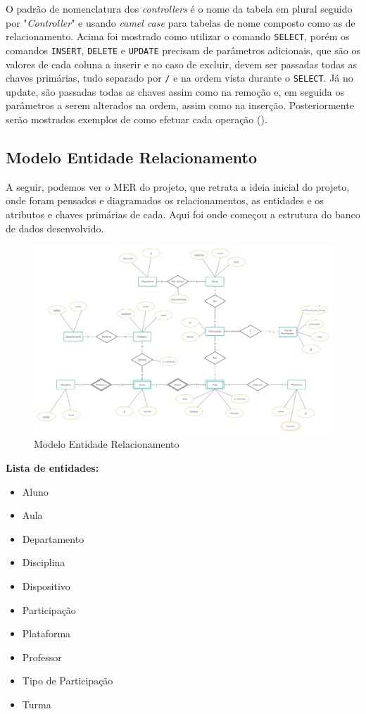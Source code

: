 \documentclass[12pt]{article}
\begin{document}
O padrão de nomenclatura dos \textit{controllers} é o nome da tabela em plural seguido por "\textit{Controller}" e usando \textit{camel case} para tabelas de nome composto como as de relacionamento. Acima foi mostrado como utilizar o comando \texttt{SELECT}, porém os comandos \texttt{INSERT}, \texttt{DELETE} e \texttt{UPDATE} precisam de parâmetros adicionais, que são os valores de cada coluna a inserir e no caso de excluir, devem ser passadas todas as chaves primárias, tudo separado por \texttt{/} e na ordem vista durante o \texttt{SELECT}. Já no update, são passadas todas as chaves assim como na remoção e, em seguida os parâmetros a serem alterados na ordem, assim como na inserção. Posteriormente serão mostrados exemplos de como efetuar cada operação (\pageref{operacoes}).

\subsection*{Modelo Entidade Relacionamento}
A seguir, podemos ver o MER do projeto, que retrata a ideia inicial do projeto, onde foram pensados e diagramados os relacionamentos, as entidades e os atributos e chaves primárias de cada. Aqui foi onde começou a estrutura do banco de dados desenvolvido.

\begin{figure}[H]
	\centering
    \includegraphics[width=1\textwidth]{MER.png}
    \caption{Modelo Entidade Relacionamento}
\end{figure}

\textbf{Lista de entidades:}
\begin{itemize}
    \setlength\itemsep{0.1em}
    \item Aluno
    \item Aula
    \item Departamento
    \item Disciplina
    \item Dispositivo
    \item Participação
    \item Plataforma
    \item Professor
    \item Tipo de Participação
    \item Turma
\end{itemize}
\end{document}
